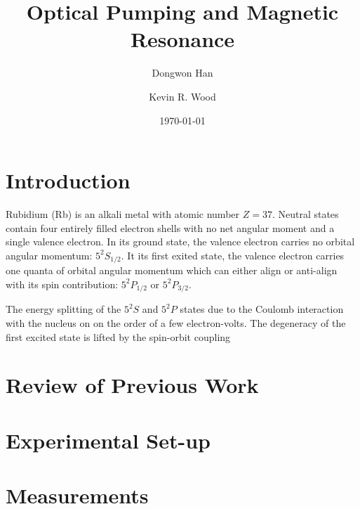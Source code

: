 \documentclass[aps,prl,twocolumn,groupedaddress]{revtex4-1}
\begin{document}
\title{Optical Pumping and Magnetic Resonance}
\author{Dongwon Han}
\author{Kevin R. Wood}


\date{\today}

\begin{abstract}
\end{abstract}

\maketitle

\section{Introduction}
Rubidium (Rb) is an alkali metal with atomic number $Z=37$.
Neutral states contain four entirely filled electron shells with no net angular moment and a single valence electron.
In its ground state, the valence electron carries no orbital angular momentum: $5^{2}S_{1/2}$.
It its first exited state, the valence electron carries one quanta of orbital angular momentum which can either align or anti-align with its spin contribution: $5^{2}P_{1/2}$ or $5^{2}P_{3/2}$. %

The energy splitting of the $5^{2}S$ and $5^{2}P$ states due to the Coulomb interaction with the nucleus on on the order of a few electron-volts.  The degeneracy of the first excited state is lifted by the spin-orbit coupling

\section{Review of Previous Work}
\section{Experimental Set-up}
\section{Measurements}
\end{document}

